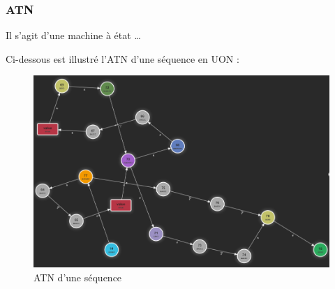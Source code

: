 \documentclass[
    iict, %
    il, %
]{heig-tb}
\begin{document}









\subsubsection{ATN}

Il s'agit d'une machine à état \dots

Ci-dessous est illustré l'ATN d'une séquence en UON :

\begin{figure}[!ht]
    \begin{center}
        \includegraphics[width=12cm]{assets/figures/seq_ATN.png}
    \end{center}
    \caption[ATN d'une séquence]{\label{seq_ATN} ATN d'une séquence}
\end{figure}
\end{document}
